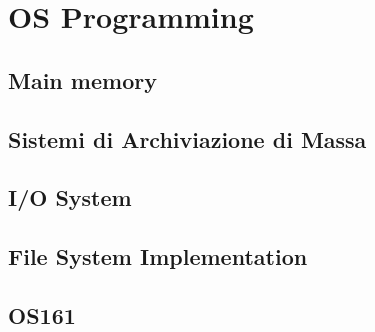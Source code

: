 \part{OS Programming}
\label{part:OSProgramming}


\chapter{Main memory}



\chapter{Sistemi di Archiviazione di Massa}


\chapter{I/O System}


\chapter{File System Implementation}


\chapter{OS161}


